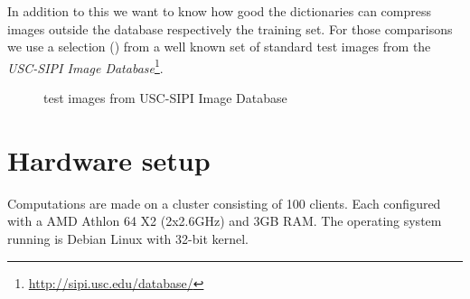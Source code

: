 In addition to this we want to know how good the dictionaries can compress
images outside the database respectively the training set. For
those comparisons we use a selection () from a
well known set of standard test images from the \emph{USC-SIPI Image
Database}\footnote{\url{http://sipi.usc.edu/database/}}. 
\begin{figure}[H]
\centering
\hspace{5mm}
\hspace{5mm}
\caption{test images from USC-SIPI Image Database}
\label{fig:USC-SIPI}
\end{figure}

\section{Hardware setup} 
Computations are made on a cluster consisting of 100 clients. Each 
configured with a AMD Athlon 64 X2 (2x2.6GHz) and 3GB RAM.
The operating system running is Debian Linux with 32-bit kernel. 

